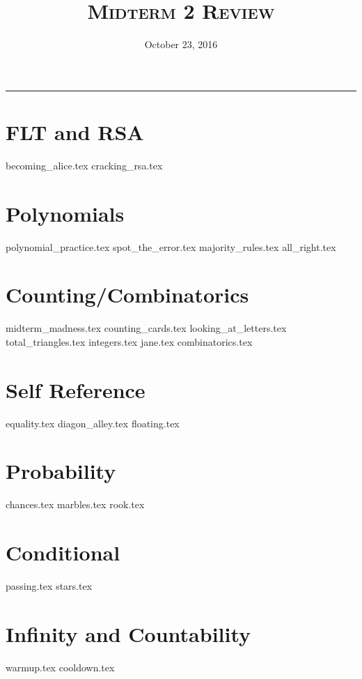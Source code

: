 \documentclass{exam}
\title{\textsc{Midterm 2 Review}}
\date{October 23, 2016}
\begin{document}
\maketitle
\rule{\textwidth}{0.15em}
\fontsize{12}{15}\selectfont
\thispagestyle{empty}

\section{FLT and RSA}
\begin{questions}
{becoming_alice.tex}
{cracking_rsa.tex}
\end{questions}

\section{Polynomials}
\begin{questions}
{polynomial_practice.tex}
{spot_the_error.tex}
{majority_rules.tex}
{all_right.tex}
\end{questions}

\section{Counting/Combinatorics}
\begin{questions}
{midterm_madness.tex}
{counting_cards.tex}
{looking_at_letters.tex}
{total_triangles.tex}
{integers.tex}
{jane.tex}
{combinatorics.tex}
\end{questions}

\section{Self Reference}
\begin{questions}
{equality.tex}
{diagon_alley.tex}
{floating.tex}
\end{questions}

\section{Probability}
\begin{questions}
{chances.tex}
{marbles.tex}
{rook.tex}
\end{questions}

\section{Conditional}
\begin{questions}
{passing.tex}
{stars.tex}
\end{questions}


\section{Infinity and Countability}
\begin{questions}
{warmup.tex}
{cooldown.tex}
\end{questions}


\end{document}
